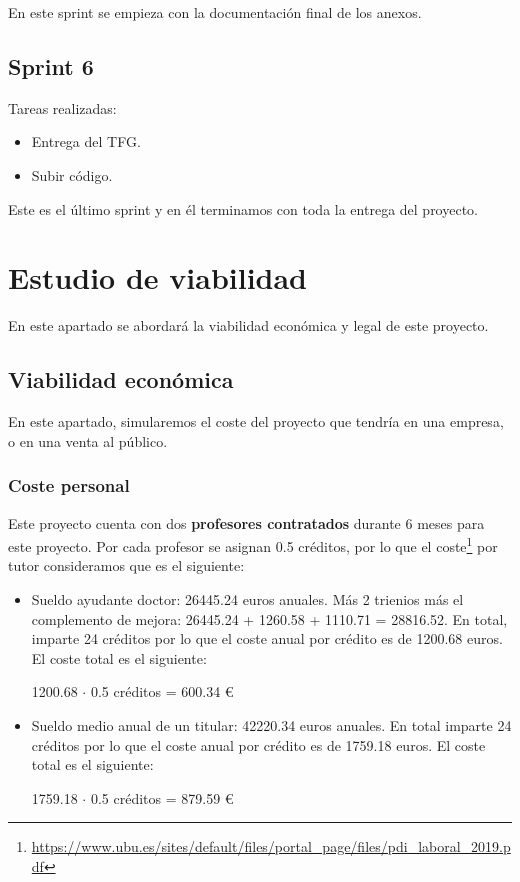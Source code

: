 En este sprint se empieza con la documentación final de los anexos.

\subsection{Sprint 6}

Tareas realizadas:

\begin{itemize}
    \item Entrega del TFG.
    \item Subir código.
\end{itemize}

Este es el último sprint y en él terminamos con toda la entrega del proyecto.

\section{Estudio de viabilidad}

En este apartado se abordará la viabilidad económica y legal de este proyecto.

\subsection{Viabilidad económica}

En este apartado, simularemos el coste del proyecto que tendría en una empresa, o en una venta al público.

\subsubsection{Coste personal}
Este proyecto cuenta con dos \textbf{profesores contratados} durante 6 meses para este proyecto. Por cada profesor se asignan 0.5 créditos, por lo que el coste\footnote{\url{https://www.ubu.es/sites/default/files/portal_page/files/pdi_laboral_2019.pdf}} por tutor consideramos que es el siguiente:
\begin{itemize}
    \item Sueldo ayudante doctor: 26445.24 euros anuales. Más 2 trienios más el complemento de mejora: 26445.24 + 1260.58 + 1110.71 = 28816.52. En total, imparte 24 créditos por lo que el coste anual por crédito es de 1200.68 euros. El coste total es el siguiente:
    
    \begin{center}
        1200.68 \(\cdot\) 0.5 créditos = 600.34 \euro
    \end{center}
    
    \item Sueldo medio anual de un titular: 42220.34 euros anuales. En total imparte 24 créditos por lo que el coste anual por crédito es de 1759.18 euros. El coste total es el siguiente:
    
    \begin{center}
        1759.18 \(\cdot\) 0.5 créditos = 879.59 \euro
    \end{center}
    
\end{itemize}

